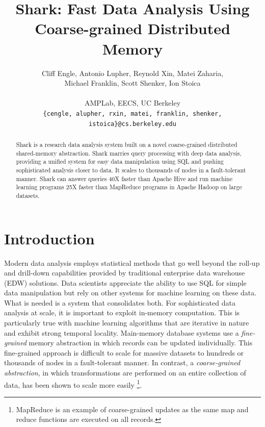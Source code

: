 \documentclass[preprint]{acm_proc_article-sp}
\begin{document}
\title{Shark: Fast Data Analysis Using Coarse-grained Distributed Memory}

\author{
Cliff Engle,
Antonio Lupher,
Reynold Xin,
Matei Zaharia,\\
Michael Franklin,
Scott Shenker,
Ion Stoica\\\\
AMPLab, EECS, UC Berkeley\\
\texttt{\{cengle, alupher, rxin, matei, franklin, shenker, istoica\}@cs.berkeley.edu}
}

\maketitle
\begin{abstract}
Shark is a research data analysis system built on a novel coarse-grained distributed shared-memory abstraction. Shark marries query processing with deep data analysis, providing a unified system for easy data manipulation using SQL and pushing sophisticated analysis closer to data. It scales to thousands of nodes in a fault-tolerant manner. Shark can answer queries 40X faster than Apache Hive and run machine learning programs 25X faster than MapReduce programs in Apache Hadoop on large datasets.
\end{abstract}






\section{Introduction}

Modern data analysis employs statistical methods that go well beyond the roll-up and drill-down capabilities provided by traditional enterprise data warehouse (EDW) solutions. Data scientists appreciate the ability to use SQL for simple data manipulation but rely on other systems for machine learning on these data. What is needed is a system that consolidates both. For sophisticated data analysis at scale, it is important to exploit in-memory computation.  This is particularly true with machine learning algorithms that are iterative in nature and exhibit strong temporal locality. Main-memory database systems use a \emph{fine-grained} memory abstraction in which records can be updated individually. This fine-grained approach is difficult to scale for massive datasets to hundreds or thousands of nodes in a fault-tolerant manner. In contrast, a \emph{coarse-grained abstraction}, in which transformations are performed on an entire collection of data, has been shown to scale more easily
\footnote{MapReduce is an example of coarse-grained updates as the same map and reduce functions are executed on all records.}.
\end{document}
